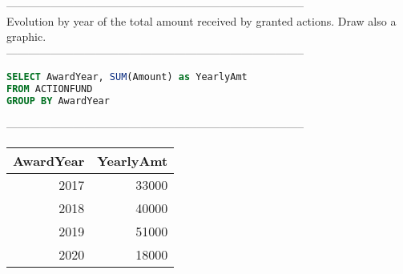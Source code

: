 --------------------------------------------------------------------------------
\\Evolution by year of the total amount received by granted actions. Draw also a graphic.\\
--------------------------------------------------------------------------------
\begin{lstlisting}[language = SQL]
SELECT AwardYear, SUM(Amount) as YearlyAmt 
FROM ACTIONFUND 
GROUP BY AwardYear
\end{lstlisting}
--------------------------------------------------------------------------------
\\\begin{tabular}{rr}
\toprule
   AwardYear &   YearlyAmt \\
\midrule
        2017 &       33000 \\
        2018 &       40000 \\
        2019 &       51000 \\
        2020 &       18000 \\
\bottomrule
\end{tabular}